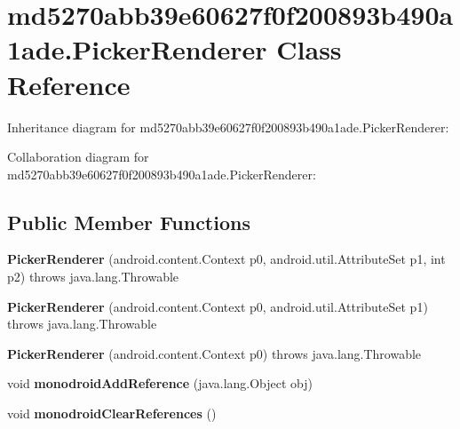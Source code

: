 \hypertarget{classmd5270abb39e60627f0f200893b490a1ade_1_1_picker_renderer}{}\section{md5270abb39e60627f0f200893b490a1ade.\+Picker\+Renderer Class Reference}
\label{classmd5270abb39e60627f0f200893b490a1ade_1_1_picker_renderer}


Inheritance diagram for md5270abb39e60627f0f200893b490a1ade.\+Picker\+Renderer\+:


Collaboration diagram for md5270abb39e60627f0f200893b490a1ade.\+Picker\+Renderer\+:
\subsection*{Public Member Functions}
\begin{DoxyCompactItemize}
\item 
\mbox{\label{classmd5270abb39e60627f0f200893b490a1ade_1_1_picker_renderer_a00b8590adecab516a7110fb8577fd90a}} 
{\bfseries Picker\+Renderer} (android.\+content.\+Context p0, android.\+util.\+Attribute\+Set p1, int p2)  throws java.\+lang.\+Throwable 	
\item 
\mbox{\label{classmd5270abb39e60627f0f200893b490a1ade_1_1_picker_renderer_a156d92620e136f1f59df295adf38b21e}} 
{\bfseries Picker\+Renderer} (android.\+content.\+Context p0, android.\+util.\+Attribute\+Set p1)  throws java.\+lang.\+Throwable 	
\item 
\mbox{\label{classmd5270abb39e60627f0f200893b490a1ade_1_1_picker_renderer_ac8b874ff9d60efd6f0108f2c112b26b9}} 
{\bfseries Picker\+Renderer} (android.\+content.\+Context p0)  throws java.\+lang.\+Throwable 	
\item 
\mbox{\label{classmd5270abb39e60627f0f200893b490a1ade_1_1_picker_renderer_a777d5b35ed425b737ed67a6488c800c8}} 
void {\bfseries monodroid\+Add\+Reference} (java.\+lang.\+Object obj)
\item 
\mbox{\label{classmd5270abb39e60627f0f200893b490a1ade_1_1_picker_renderer_a8ea4822897e59386ee80a0fccf40c367}} 
void {\bfseries monodroid\+Clear\+References} ()
\end{DoxyCompactItemize}
